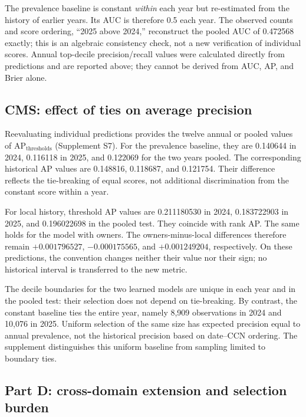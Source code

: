 The prevalence baseline is constant \emph{within} each year but re-estimated from the history of earlier years\cite{hgbcode}. Its AUC is therefore 0.5 each year. The observed counts and score ordering, “2025 above 2024,” reconstruct the pooled AUC of 0.472568 exactly; this is an algebraic consistency check, not a new verification of individual scores. Annual top-decile precision/recall values were calculated directly from predictions and are reported above; they cannot be derived from AUC, AP, and Brier alone.

\subsection{CMS: effect of ties on average precision}
\label{sec:ties}
Reevaluating individual predictions provides the twelve annual or pooled values of $\mathrm{AP}_{\mathrm{thresholds}}$ (Supplement S7). For the prevalence baseline, they are 0.140644 in 2024, 0.116118 in 2025, and 0.122069 for the two years pooled. The corresponding historical AP values are 0.148816, 0.118687, and 0.121754. Their difference reflects the tie-breaking of equal scores, not additional discrimination from the constant score within a year.

For local history, threshold AP values are 0.211180530 in 2024, 0.183722903 in 2025, and 0.196022698 in the pooled test. They coincide with rank AP. The same holds for the model with owners. The owners-minus-local differences therefore remain $+0.001796527$, $-0.000175565$, and $+0.001249204$, respectively. On these predictions, the convention changes neither their value nor their sign; no historical interval is transferred to the new metric.

The decile boundaries for the two learned models are unique in each year and in the pooled test: their selection does not depend on tie-breaking. By contrast, the constant baseline ties the entire year, namely 8,909 observations in 2024 and 10,076 in 2025. Uniform selection of the same size has expected precision equal to annual prevalence, not the historical precision based on date--CCN ordering. The supplement distinguishes this uniform baseline from sampling limited to boundary ties.

\subsection{Part D: cross-domain extension and selection burden}

\begin{table}[!htbp]
\centering\small
\caption{Part D, 2024 test, exact generic identity. Recalls are at $K=10$. Recall and MRR cover the 1,019 prescribers with positives; P@10 uses the 2,000 eligible prescribers. BPR macro/MRR is taken to six decimals from the report. Sources: summary and compact run\cite{hgbresults,hgbpartd}.}
\label{tab:partd}

\end{table}

